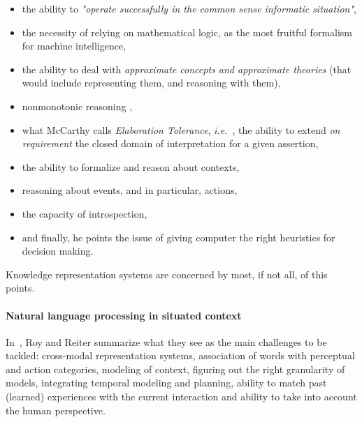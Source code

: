 \documentclass[a4paper, twocolumn]{article}
\newcommand{\ie}{{\textit{i.e.~}}}
\begin{document}
\begin{itemize}

	\item the ability to \emph{"operate successfully in the common sense
	informatic situation"},

	\item the necessity of relying on mathematical logic, as the most fruitful
	formalism for machine intelligence,

	\item the ability to deal with \emph{approximate concepts and approximate
	theories} (that would include representing them, and reasoning with them),

	\item nonmonotonic reasoning ,

	\item what McCarthy calls \emph{Elaboration Tolerance}, \ie, the ability to
	extend \emph{on requirement} the closed domain of interpretation for a
	given assertion,

	\item the ability to formalize and reason about contexts,

	\item reasoning about events, and in particular, actions,

	\item the capacity of introspection,

	\item and finally, he points the issue of giving computer the right
	heuristics for decision making.

\end{itemize}

Knowledge representation systems are concerned by most, if not all, of this
points.

\paragraph{Natural language processing in situated context}

In~\cite{Roy2005}, Roy and Reiter summarize what they see as the main
challenges to be tackled: cross-modal representation systems, association of
words with perceptual and action categories, modeling of context, figuring out
the right granularity of models, integrating temporal modeling and planning,
ability to match past (learned) experiences with the current interaction and
ability to take into account the human perspective.
\end{document}
